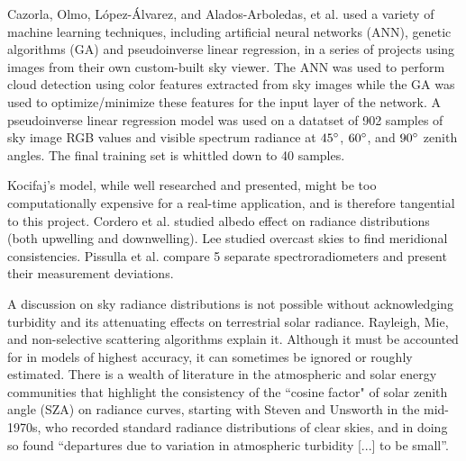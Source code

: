Cazorla, Olmo, L\'{o}pez-\'{A}lvarez, and Alados-Arboledas, et al. used a variety of machine learning techniques, including artificial neural networks (ANN), genetic algorithms (GA) and pseudoinverse linear regression, in a series of projects using images from their own custom-built sky viewer.\cite{lopez-alvarez_using_2008, cazorla_using_2008, cazorla_development_2008} The ANN was used to perform cloud detection using color features extracted from sky images while the GA was used to optimize/minimize these features for the input layer of the network.\cite{cazorla_development_2008} A pseudoinverse linear regression model was used on a datatset of 902 samples of sky image RGB values and visible spectrum radiance at $45\degree$, $60\degree$, and $90\degree$ zenith angles. The final training set is whittled down to 40 samples.\cite{cazorla_development_2008}

Kocifaj's model, while well researched and presented, might be too computationally expensive for a real-time application, and is therefore tangential to this project.\cite{kocifaj_angular_2012, kocifaj_unified_2015} Cordero et al. studied albedo effect on radiance distributions (both upwelling and downwelling).\cite{cordero_downwelling_2013} Lee studied overcast skies to find meridional consistencies.\cite{lee_jr_measuring_2008} Pissulla et al. compare 5 separate spectroradiometers and present their measurement deviations.\cite{pissulla_comparison_2009} %

A discussion on sky radiance distributions is not possible without acknowledging turbidity and its attenuating effects on terrestrial solar radiance. Rayleigh,\cite{strutt_lightfromsky_1871} Mie,\cite{wriedt_miereview_2012, wriedt_miebook_2012, mie_beitrage_1908} and non-selective scattering algorithms explain it. Although it must be accounted for in models of highest accuracy, it can sometimes be ignored or roughly estimated. There is a wealth of literature in the atmospheric and solar energy communities that highlight the consistency of the ``cosine factor" of solar zenith angle (SZA) on radiance curves, starting with Steven and Unsworth in the mid-1970s, who recorded standard radiance distributions of clear skies, and in doing so found \enquote{departures due to variation in atmospheric turbidity [...] to be small}.\cite{steven_standard_1977}

